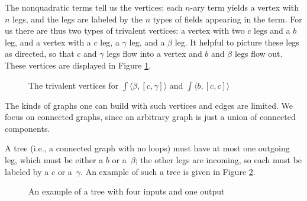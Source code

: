 The nonquadratic terms tell us the vertices:
each $n$-ary term yields a vertex with $n$ legs,
and the legs are labeled by the $n$ types of fields appearing in the term.
For us there are thus two types of trivalent vertices:
a vertex with two $c$ legs and a $b$ leg, 
and a vertex with a $c$ leg, a $\gamma$ leg, and a $\beta$ leg.
It helpful to picture these legs as directed,
so that $c$ and $\gamma$ legs flow into a vertex
and $b$ and $\beta$ legs flow out. 
These vertices are displayed in Figure \ref{fig:verts}.

\begin{figure}
\caption{The trivalent vertices for $\int \langle \beta, [c,\gamma] \rangle$ and $\int \langle b, [c,c] \rangle$}
\label{fig:verts}
\end{figure}

The kinds of graphs one can build with such vertices and edges are limited.
We focus on connected graphs, since an arbitrary graph is just a union of connected components.

A tree (i.e., a connected graph with no loops) must have at most one outgoing leg,
which must be either a $b$ or a~$\beta$;
the other legs are incoming, so each must be labeled by a $c$ or a~$\gamma$. 
An example of such a tree is given in Figure \ref{fig:tree}.

\begin{figure}
\caption{An example of a tree with four inputs and one output}
\label{fig:tree}
\end{figure}
		
